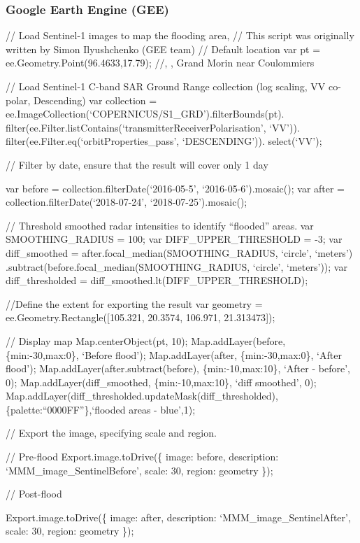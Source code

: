 \documentclass[]{book}
\theoremstyle{definition}
\theoremstyle{definition}
\theoremstyle{definition}
\theoremstyle{remark}
\begin{document}
\subsubsection{Google Earth Engine (GEE)}\label{google-earth-engine-gee}

// Load Sentinel-1 images to map the flooding area, // This script was
originally written by Simon Ilyushchenko (GEE team) // Default location
var pt = ee.Geometry.Point(96.4633,17.79); //, , Grand Morin near
Coulommiers

// Load Sentinel-1 C-band SAR Ground Range collection (log scaling, VV
co-polar, Descending) var collection =
ee.ImageCollection(`COPERNICUS/S1\_GRD').filterBounds(pt).
filter(ee.Filter.listContains(`transmitterReceiverPolarisation', `VV')).
filter(ee.Filter.eq(`orbitProperties\_pass', `DESCENDING')).
select(`VV');

// Filter by date, ensure that the result will cover only 1 day

var before = collection.filterDate(`2016-05-5', `2016-05-6').mosaic();
var after = collection.filterDate(`2018-07-24', `2018-07-25').mosaic();

// Threshold smoothed radar intensities to identify ``flooded'' areas.
var SMOOTHING\_RADIUS = 100; var DIFF\_UPPER\_THRESHOLD = -3; var
diff\_smoothed = after.focal\_median(SMOOTHING\_RADIUS, `circle',
`meters') .subtract(before.focal\_median(SMOOTHING\_RADIUS, `circle',
`meters')); var diff\_thresholded =
diff\_smoothed.lt(DIFF\_UPPER\_THRESHOLD);

//Define the extent for exporting the result var geometry =
ee.Geometry.Rectangle({[}105.321, 20.3574, 106.971, 21.313473{]});

// Display map Map.centerObject(pt, 10); Map.addLayer(before,
\{min:-30,max:0\}, `Before flood'); Map.addLayer(after,
\{min:-30,max:0\}, `After flood'); Map.addLayer(after.subtract(before),
\{min:-10,max:10\}, `After - before', 0); Map.addLayer(diff\_smoothed,
\{min:-10,max:10\}, `diff smoothed', 0);
Map.addLayer(diff\_thresholded.updateMask(diff\_thresholded),
\{palette:``0000FF''\},`flooded areas - blue',1);

// Export the image, specifying scale and region.

// Pre-flood Export.image.toDrive(\{ image: before, description:
`MMM\_image\_SentinelBefore', scale: 30, region: geometry \});

// Post-flood

Export.image.toDrive(\{ image: after, description:
`MMM\_image\_SentinelAfter', scale: 30, region: geometry \});
\end{document}
